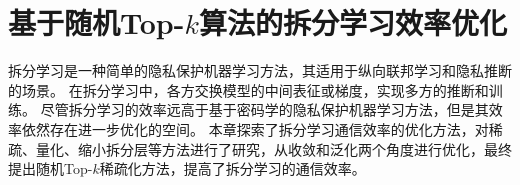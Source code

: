 \chapter{基于随机Top-$k$算法的拆分学习效率优化}
\label{chap:randomized_topk}

拆分学习是一种简单的隐私保护机器学习方法，其适用于纵向联邦学习和隐私推断的场景。
%
在拆分学习中，各方交换模型的中间表征或梯度，实现多方的推断和训练。
%
尽管拆分学习的效率远高于基于密码学的隐私保护机器学习方法，但是其效率依然存在进一步优化的空间。
%
本章探索了拆分学习通信效率的优化方法，对稀疏、量化、缩小拆分层等方法进行了研究，从收敛和泛化两个角度进行优化，最终提出随机Top-$k$稀疏化方法，提高了拆分学习的通信效率。
%






